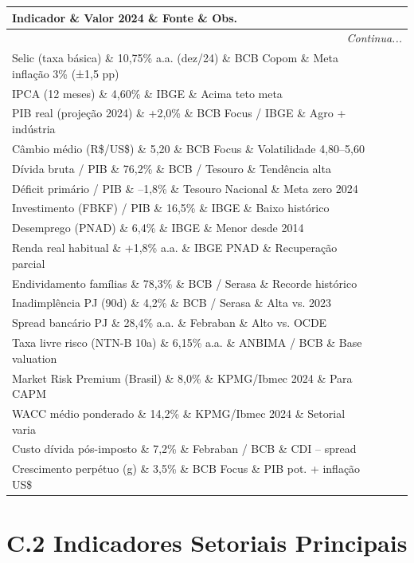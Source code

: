 \begin{longtable}{p{5cm}p{3cm}p{3cm}p{4cm}}
\toprule
\textbf{Indicador} \& \textbf{Valor 2024} \& \textbf{Fonte} \& \textbf{Obs.}\\
\midrule
\endhead
\midrule
\multicolumn{4}{r}{\textit{Continua...}} \\
\endfoot
\bottomrule
\endlastfoot

Selic (taxa básica) \& 10,75\% a.a. (dez/24) \& BCB Copom \& Meta inflação 3\% (±1,5 pp) \\
IPCA (12 meses) \& 4,60\% \& IBGE \& Acima teto meta \\
PIB real (projeção 2024) \& +2,0\% \& BCB Focus / IBGE \& Agro + indústria \\
Câmbio médio (R\$/US\$) \& 5,20 \& BCB Focus \& Volatilidade 4,80–5,60\\
Dívida bruta / PIB \& 76,2\% \& BCB / Tesouro \& Tendência alta \\
Déficit primário / PIB \& –1,8\% \& Tesouro Nacional \& Meta zero 2024 \\
Investimento (FBKF) / PIB \& 16,5\% \& IBGE \& Baixo histórico \\
Desemprego (PNAD) \& 6,4\% \& IBGE \& Menor desde 2014 \\
Renda real habitual \& +1,8\% a.a. \& IBGE PNAD \& Recuperação parcial \\
Endividamento famílias \& 78,3\% \& BCB / Serasa \& Recorde histórico \\
Inadimplência PJ (90d) \& 4,2\% \& BCB / Serasa \& Alta vs. 2023 \\
Spread bancário PJ \& 28,4\% a.a. \& Febraban \& Alto vs. OCDE \\
Taxa livre risco (NTN-B 10a) \& 6,15\% a.a. \& ANBIMA / BCB \& Base valuation \\
Market Risk Premium (Brasil) \& 8,0\% \& KPMG/Ibmec 2024 \& Para CAPM \\
WACC médio ponderado \& 14,2\% \& KPMG/Ibmec 2024 \& Setorial varia \\
Custo dívida pós-imposto \& 7,2\% \& Febraban / BCB \& CDI – spread \\
Crescimento perpétuo (g) \& 3,5\% \& BCB Focus \& PIB pot. + inflação US\$ \\
\end{longtable}

\section*{C.2 Indicadores Setoriais Principais}

